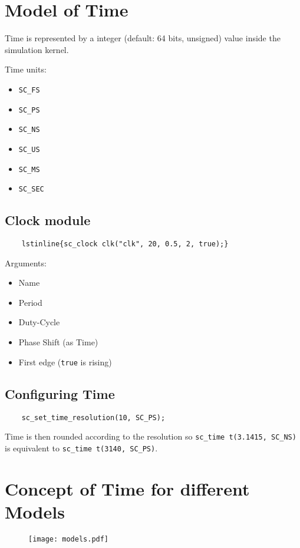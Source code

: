 \section{Model of Time}
Time is represented by a integer (default: 64 bits, unsigned) value inside the simulation kernel.

Time units:
\begin{itemize}
    \item \lstinline{SC_FS}
    \item \lstinline{SC_PS}
    \item \lstinline{SC_NS}
    \item \lstinline{SC_US}
    \item \lstinline{SC_MS}
    \item \lstinline{SC_SEC}
\end{itemize}

\subsection{Clock module}
\begin{lstlisting}
    lstinline{sc_clock clk("clk", 20, 0.5, 2, true);}
\end{lstlisting}

Arguments:
\begin{itemize}
    \item Name
    \item Period
    \item Duty-Cycle
    \item Phase Shift (as Time)
    \item First edge (\lstinline{true} is rising)
\end{itemize}

\subsection{Configuring Time}
\begin{lstlisting}
    sc_set_time_resolution(10, SC_PS);
\end{lstlisting}

Time is then rounded according to the resolution so
\lstinline{sc_time t(3.1415, SC_NS)} is equivalent to
\lstinline{sc_time t(3140, SC_PS)}.

\section{Concept of Time for different Models}
\begin{figure}[H]
    \centering
    \texttt{[image: models.pdf]}
\end{figure}

